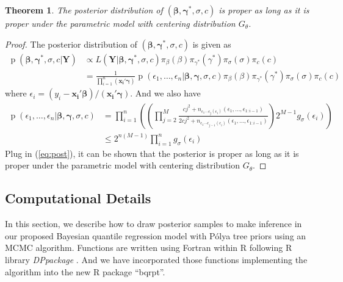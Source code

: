 \documentclass[12pt]{article}
\newtheorem{thm}{Theorem}[section]
\newcommand{\polya}{P\'{o}lya}
\DeclareMathOperator{\pr}{p}
\begin{document}
\begin{thm}
The posterior distribution of $(\bm{\beta}, \bm{\gamma^{*}}, \sigma, c)$ is proper as long as it is proper under the parametric model with centering distribution $G_{\theta}$.
\end{thm}

\begin{proof}
The posterior distribution of $(\bm{\beta}, \bm{\gamma^{*}}, \sigma, c)$ is given as
\begin{equation}\label{eq:post}
  \begin{aligned}
    \pr(\bm{\beta}, \bm{\gamma^{*}}, \sigma, c|\bm{Y}) & \propto L(\bm{Y}|
    \bm{\beta}, \bm{\gamma^{*}}, \sigma, c) \pi_{\beta}(\beta)
    \pi_{\gamma^{*}}(\gamma^{*}) \pi_{\sigma}(\sigma) \pi_c(c) \\
    & = \frac{1}{\prod_{i=1}^n (\bm{x_i'\gamma})} \pr \left(
      \epsilon_1, \ldots, \epsilon_n | \bm{\beta}, \bm{\gamma},
      \sigma, c\right) \pi_{\beta}(\beta)
    \pi_{\gamma^{*}}(\gamma^{*}) \pi_{\sigma}(\sigma) \pi_c(c)
  \end{aligned}
\end{equation}
where $\epsilon_i = (y_i - \bm{x_i'\beta})/(\bm{x_i'\gamma})$. And we also have
\begin{align*}
\pr \left(\epsilon_1, \ldots, \epsilon_n | \bm{\beta}, \bm{\gamma}, \sigma, c\right) &
 = \prod_{i = 1}^{n} \left( \left(\prod_{j=2}^M \frac{cj^2 + n_{\epsilon_1 \cdots \epsilon_j(\epsilon_{i}) }(\epsilon_1, \ldots, \epsilon_{1:i-1})}{2cj^2+ n_{\epsilon_1 \cdots \epsilon_{j-1}(\epsilon_i)}(\epsilon_1, \ldots, \epsilon_{1:i-1})}    \right) 2^{M-1} g_{\sigma}(\epsilon_i) \right) \\
& \le 2^{n(M-1)} \prod_{i = 1}^n g_{\sigma}(\epsilon_i)
\end{align*}
Plug in (\ref{eq:post}), it can be shown that the posterior is proper as long as it is proper under the parametric model with centering distribution $G_{\theta}$.
\end{proof}

\subsection{Computational Details}\label{ch2:sec:computation}

In this section, we describe how to draw posterior samples to make
inference in our proposed Bayesian quantile regression model with
\polya{} tree priors using an MCMC algorithm. Functions are written
using Fortran within R \citep{R} following R library
\textit{DPpackage} \citep{DPpackage}. And we have incorporated those
functions implementing the algorithm into the new R \citep{R} package
``bqrpt''.
\end{document}
